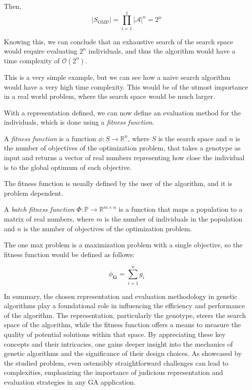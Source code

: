   Then,
  \[
    |S_\mathrm{OMP}| = \prod_{i=1}^1 |\mathcal{A}|^n = 2^n
  \]

  Knowing this, we can conclude that an exhaustive search of the search space 
  would require 
  evaluating \(2^n\) individuals, and thus the algorithm would have a time complexity of 
  \(\mathcal{O}(2^n)\).
  
  This is a very simple example, but we can see how a naive search algorithm would have a very
  high time complexity.
  This would be of the utmost importance in a real world problem, where the search space would be
  much larger.

  With a representation defined, we can now define an evaluation method for the individuals, which
  is done using a \emph{fitness function}.

  \begin{definition}
  \label{def:fitness_function}
    A \emph{fitness function} is a function \(\phi: S \rightarrow \mathbb{R}^n\), where \(S\) is the
    search space and \(n\) is the number of objectives of the optimization problem, that takes a
    genotype as input and returns a vector of real numbers representing how close the individual 
    is to the global optimum of each objective.

    The fitness function is usually defined by the user of the algorithm, and it is problem
    dependent.
  \end{definition}

  \begin{definition}
  \label{def:batch_fitness_function}
    A \emph{batch fitness function} \(\Phi: \mathbb{P} \rightarrow \mathbb{R}^{m \times n}\) is a 
    function that maps a population to a matrix of real numbers, where \(m\) is the number of
    individuals in the population and \(n\) is the number of objectives of the optimization
    problem.
  \end{definition}

  The one max problem is a maximization problem with a single objective, so the
  fitness function would be defined as follows:

  \begin{equation}
    \label{eq:fitness_function:one_max}
    \phi_\mathbf{G} = \sum_{i=1}^n g_i
  \end{equation}

  In summary, the chosen representation and evaluation methodology in genetic 
  algorithms play a foundational role in influencing the efficiency and 
  performance of the algorithm.
  The representation, particularly the genotype, steers the search space of the 
  algorithm, while the fitness function offers a means to measure the quality 
  of potential solutions within that space.
  By appreciating these key concepts and their intricacies, one gains deeper 
  insight into the mechanics of genetic algorithms and the significance of 
  their design choices.
  As showcased by the studied problem, even ostensibly straightforward 
  challenges can lead to complexities, emphasizing the importance of judicious 
  representation and evaluation strategies in any GA application.